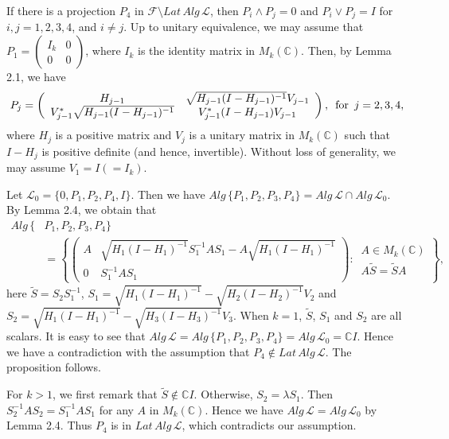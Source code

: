 \documentclass[12pt]{article}
\newcommand{\LLL}{\mathcal L} %
\newcommand{\FFF}{\mathcal F}
\newcommand{\C}{\mathbb C} %
\def\L{{\mathcal{L}}}
\begin{document}
{If there is a projection $P_4$ in $\FFF \setminus Lat\,Alg\,\LLL$,
then $P_i\wedge P_j=0$ and $P_i\vee P_j=I$
for $i,j=1,2,3,4$, and $i\neq j$. Up to unitary equivalence, we may assume that $P_1=\left(\begin{array}{cc}  I_k & 0\\
0 &0\end{array}\right)$, where $I_k$ is the identity matrix in
$M_k(\C)$. Then, by Lemma 2.1, we have
\begin{align*}
P_j=\left(\begin{array}{cc} H_{j-1} &
\sqrt{H_{j-1}(I-H_{j-1})^{-1}}V_{j-1}\\
V_{j-1}^{*}\sqrt{H_{j-1}(I-H_{j-1})^{-1}} &
V_{j-1}^{*}(I-H_{j-1})V_{j-1}\end{array}\right),\,\,\,
\hbox{for}\,\,\, j=2,3,4,
\end{align*}
where $H_j$ is a positive matrix and $V_j$ is a unitary matrix in
$M_k(\C)$ such that $I-H_j$ is positive definite (and hence,
invertible). Without loss of generality, we may assume
$V_1=I(=I_k)$.

Let $\L_0=\{0,P_1,P_2,P_4,I\}$. Then we have $
Alg\,\{P_1,P_2,P_3,P_4\}= Alg\,\L\cap Alg\,\L_0$. By Lemma 2.4, we
obtain that
\begin{align*}
 Alg\,\{&P_1,P_2,P_3,P_4\}\\
 &=\left\{\left(\begin{array}{cc} A & \sqrt{H_1(I-H_1)^{-1}}S_1^{-1}AS_1-A\sqrt{H_1(I-H_1)^{-1}}\\
0 & S_1^{-1}AS_1\end{array}\right):\, \begin{array}{l} A\in M_k(\C)\\
A\widetilde{S}=\widetilde{S}A\end{array}\right\},
\end{align*}
here $\widetilde{S}=S_2S_1^{-1}$,
$S_1=\sqrt{H_1(I-H_1)^{-1}}-\sqrt{H_2(I-H_2)^{-1}}V_2$ and
$S_2=\sqrt{H_1(I-H_1)^{-1}}-\sqrt{H_3(I-H_3)^{-1}}V_3$. When $k =
1$, $\widetilde{S}$, $S_1$ and $S_2$ are all scalars. It is easy to
see that $Alg\,\L=Alg\,\{P_1,P_2,P_3,P_4\}= Alg\,\L_0= \C I$. Hence
we have a contradiction with the assumption that $P_4\notin
Lat\,Alg\,\LLL$. The proposition follows.

For $k > 1$, we first remark that $\widetilde{S} \notin\C I$.
Otherwise, $S_2 = \lambda S_1$. Then $S_2^{-1}AS_2=S_1^{-1}AS_1$ for
any $A$ in $M_k(\C)$. Hence we have $ Alg\,\L= Alg\,\L_0$ by Lemma
2.4. Thus $P_4$ is in $Lat\,Alg\,\L$, which contradicts our
assumption.

}
\end{document}
